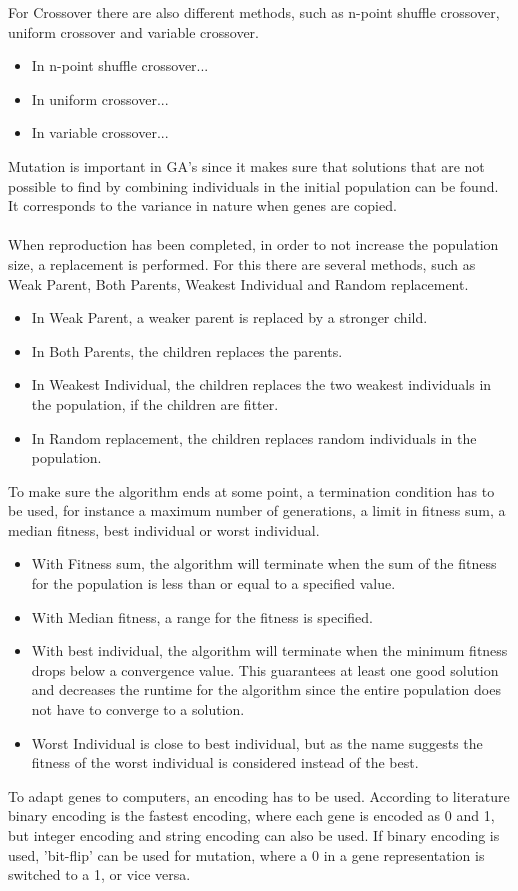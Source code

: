 For Crossover there are also different methods, such as n-point shuffle crossover, uniform crossover and variable crossover.
\begin{itemize}
\item In n-point shuffle crossover...
\item In uniform crossover...
\item In variable crossover...
\end{itemize}
Mutation is important in GA's since it makes sure that solutions that are not possible to find by combining individuals in the initial population can be found. It corresponds to the variance in nature when genes are copied.\\\\ %
When reproduction has been completed, in order to not increase the population size, a replacement is performed. For this there are several methods, such as Weak Parent, Both Parents, Weakest Individual and Random replacement.
\begin{itemize}
\item In Weak Parent, a weaker parent is replaced by a stronger child.
\item In Both Parents, the children replaces the parents.
\item In Weakest Individual, the children replaces the two weakest individuals in the population, if the children are fitter.
\item In Random replacement, the children replaces random individuals in the population.
\end{itemize}
To make sure the algorithm ends at some point, a termination condition has to be used, for instance a maximum number of generations, a limit in fitness sum, a median fitness, best individual or worst individual.
\begin{itemize}
\item With Fitness sum, the algorithm will terminate when the sum of the fitness for the population is less than or equal to a specified value.
\item With Median fitness, a range for the fitness is specified.
\item With best individual, the algorithm will terminate when the minimum fitness drops below a convergence value. This guarantees at least one good solution and decreases the runtime for the algorithm since the entire population does not have to converge to a solution.
\item Worst Individual is close to best individual, but as the name suggests the fitness of the worst individual is  considered instead of the best.
\end{itemize}
To adapt genes to computers, an encoding has to be used.  According to literature \cite{GAHandbook1} binary encoding is the fastest encoding, where each gene is encoded as 0 and 1, but integer encoding and string encoding can also be used. If binary encoding is used, 'bit-flip' can be used for mutation, where a 0 in a gene representation is switched to a 1, or vice versa.
